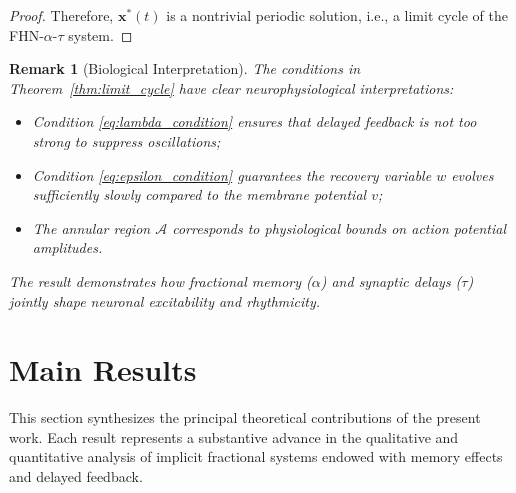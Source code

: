 \documentclass[12pt,a4paper]{article}
\newtheorem{remark}[theorem]{Remark}
\numberwithin{equation}{section}
\begin{document}
\begin{proof}
	Therefore, $\mathbf{x}^*(t)$ is a nontrivial periodic solution, i.e., a limit cycle of the FHN-$\alpha$-$\tau$ system.
\end{proof}

\begin{remark}[Biological Interpretation]
	The conditions in Theorem~\ref{thm:limit_cycle} have clear neurophysiological interpretations:
	\begin{itemize}
		\item Condition \eqref{eq:lambda_condition} ensures that delayed feedback is not too strong to suppress oscillations;
		\item Condition \eqref{eq:epsilon_condition} guarantees the recovery variable $w$ evolves sufficiently slowly compared to the membrane potential $v$;
		\item The annular region $\mathcal{A}$ corresponds to physiological bounds on action potential amplitudes.
	\end{itemize}
	The result demonstrates how fractional memory ($\alpha$) and synaptic delays ($\tau$) jointly shape neuronal excitability and rhythmicity.
\end{remark}
	
	\section{Main Results}
	\label{sec:results}
	
	This section synthesizes the principal theoretical contributions of the present work. Each result represents a substantive advance in the qualitative and quantitative analysis of implicit fractional systems endowed with memory effects and delayed feedback.
	
\end{document}

